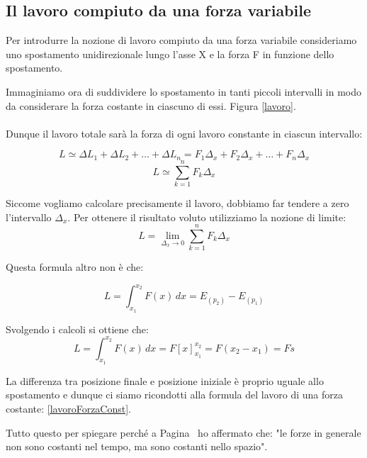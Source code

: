 \subsection{Il lavoro compiuto da una forza variabile}

Per introdurre la nozione di lavoro compiuto da una forza variabile consideriamo uno spostamento unidirezionale lungo l’asse X e la forza F in funzione dello spostamento. 

Immaginiamo ora di suddividere lo spostamento in tanti piccoli intervalli in modo da considerare la forza costante in ciascuno di essi. Figura \ref{lavoro}.
\paragraph{}
Dunque il lavoro totale sarà la forza di ogni lavoro constante in ciascun intervallo: 

\begin{equation*}
    L \simeq \Delta L_1 + \Delta L_2 + \dots +  \Delta L_n = F_1\Delta_x + F_2\Delta_x + \dots + F_n\Delta_x
\end{equation*}
\begin{equation}
    L \simeq \sum_{k = 1} ^ n F_k \Delta_x
\end{equation}


Siccome vogliamo calcolare precisamente il lavoro, dobbiamo far tendere a zero l'intervallo $\Delta_x$. Per ottenere il risultato voluto utilizziamo la nozione di limite:
\begin{equation}
    L = \lim_{\Delta_x \to 0} \sum_{k = 1} ^ n F_k \Delta_x
    \label{limiteIntervalloInfinitesimoLavoro}
\end{equation}

Questa formula altro non è che:

\begin{equation}
    L = \int_{x_1}^{x_2} F(x) \, dx = E_{(p_2)} - E_{(p_1)}
\end{equation}

Svolgendo i calcoli si ottiene che:
\begin{equation*}
    L = \int_{x_1}^{x_2} F(x) \, dx = F[x]_{x_1}^{x_2} = F(x_2 - x_1) = Fs
\end{equation*}

La differenza tra posizione finale e posizione iniziale è proprio uguale allo spostamento e dunque ci siamo ricondotti alla formula del lavoro di una forza costante: \ref{lavoroForzaConst}.

Tutto questo per spiegare perché a Pagina~\pageref{costantiSpazio} ho affermato che: "le forze in generale non sono costanti nel tempo, ma sono
costanti nello spazio".


